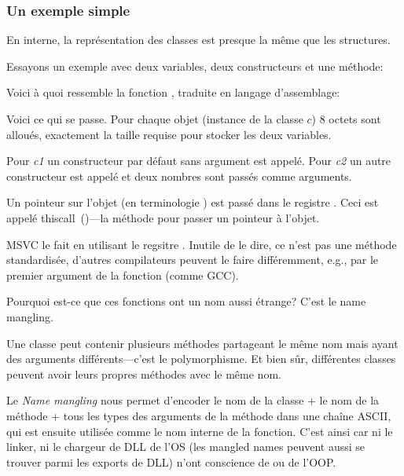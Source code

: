 ﻿\subsubsection{Un exemple simple}

En interne, la représentation des classes \Cpp est presque la même que les structures.

Essayons un exemple avec deux variables, deux constructeurs et une méthode:




Voici à quoi ressemble la fonction \main, traduite en langage d'assemblage:



Voici ce qui se passe.
Pour chaque objet (instance de la classe $c$) 8 octets sont alloués, exactement la
taille requise pour stocker les deux variables.

Pour \emph{c1} un constructeur par défaut sans argument  est appelé.
Pour \emph{c2} un autre constructeur  est appelé et deux nombres
sont passés comme arguments.

\label{thiscall}

Un pointeur sur l'objet (\ITthis en terminologie \Cpp) est passé dans le registre \ECX.
Ceci est appelé thiscall~()---la méthode pour passer un pointeur
à l'objet.

MSVC le fait en utilisant le regsitre \ECX. Inutile de le dire, ce n'est pas une
méthode standardisée, d'autres compilateurs peuvent le faire différemment, e.g.,
par le premier argument de la fonction (comme GCC).

\label{namemangling}

Pourquoi est-ce que ces fonctions ont un nom aussi étrange?
C'est le \gls{name mangling}.

Une classe \Cpp peut contenir plusieurs méthodes partageant le même nom mais ayant
des arguments différents---c'est le polymorphisme.
Et bien sûr, différentes classes peuvent avoir leurs propres méthodes avec le même nom.


Le \emph{Name mangling} nous permet d'encoder le nom de la classe + le nom de la méthode +
tous les types des arguments de la méthode dans une chaîne ASCII, qui est ensuite
utilisée comme le nom interne de la fonction.
C'est ainsi car ni le linker, ni le chargeur de DLL de l'\ac{OS} (les mangled names
peuvent aussi se trouver parmi les exports de DLL) n'ont conscience de \Cpp ou de
l'\ac{OOP}.

